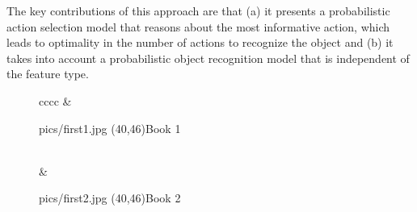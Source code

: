 The key contributions of this approach are that (a) it presents a probabilistic action selection model that reasons about the most informative action, which leads to optimality in the number of actions to recognize the object and (b) it takes into account a probabilistic object recognition model that is independent of the feature type.



    \setlength{\tabcolsep}{0.1em}
    \begin{figure}[ht]
    \begin{tabular}{cccc}
     &  {\begin{overpic}[width=0.46\columnwidth]{pics/first1.jpg} 
    \put(40,46){Book 1}
    \end{overpic}}\\
     &   {\begin{overpic}[width=0.46\columnwidth]{pics/first2.jpg} 
    \put(40,46){Book 2}
    \end{overpic}} \\

\end{tabular}
\end{figure}
